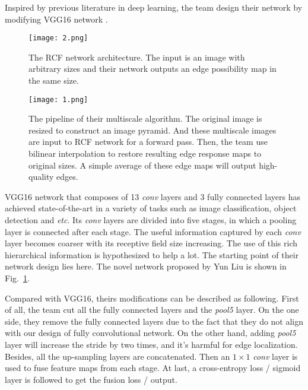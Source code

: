 \documentclass[10pt,twocolumn,letterpaper]{article}
\begin{document}
Inspired by previous literature in deep learning, the team design their network by modifying VGG16 network \cite{simonyan2014very}. 
\begin{figure}
	\begin{center}
		\texttt{[image: 2.png]}
	\end{center}
	\caption{The RCF network architecture. The input is an image with arbitrary sizes and their network outputs an edge possibility map in the same size.}
	\label{fig:2}
\end{figure}

\begin{figure*}
	\begin{center}
		\texttt{[image: 1.png]}
	\end{center}
	\caption{The pipeline of their multiscale algorithm. The original image is resized to construct an image pyramid. And these multiscale images are input to RCF network for a forward pass. Then, the team use bilinear interpolation to restore resulting edge response maps to original sizes. A simple average of these edge maps will output high-quality edges.}
	\label{fig:1}
\end{figure*}

VGG16 network that composes of 13 \emph{conv} layers and 3 fully connected layers has achieved state-of-the-art in a variety of tasks such as image classification, object detection and \emph{etc}. Its \emph{conv} layers are divided into five stages, in which a pooling layer is connected after each stage. The useful information captured by each \emph{conv} layer becomes coarser with its receptive field size increasing. The use of this rich hierarchical information is hypothesized to help a lot. The starting point of their network design lies here. The novel network proposed by Yun Liu is shown in Fig.~\ref{fig:2}.

Compared with VGG16, theirs modifications can be described as following. First of all, the team cut all the fully connected layers and the \emph{pool5} layer. On the one side, they remove the fully connected layers due to the fact that they do not align with our design of fully convolutional network. On the other hand, adding \emph{pool5} layer will increase the stride by two times, and it’s harmful for edge localization. Besides, all the up-sampling layers are concatenated. Then an $1\times 1 $ \emph{conv} layer is used to fuse feature maps from each stage. At last, a cross-entropy loss / sigmoid layer is followed to get the fusion loss / output.
\end{document}
